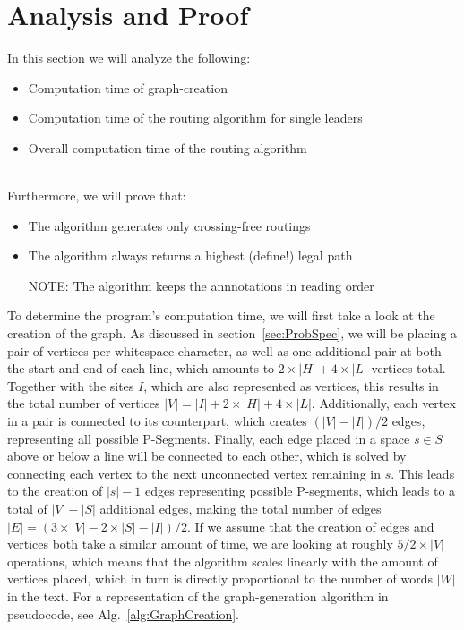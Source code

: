 \documentclass[11pt,a4paper]{vutinfth}
\begin{document}
\section{Analysis and Proof}

In this section we will analyze the following:

\begin{itemize}
 \item Computation time of graph-creation
 \item Computation time of the routing algorithm for single leaders
 \item Overall computation time of the routing algorithm
\end{itemize}
~\\
Furthermore, we will prove that:
\begin{itemize}
\item The algorithm generates only crossing-free routings
\item The algorithm always returns a highest (define!) legal path

NOTE: The algorithm keeps the annnotations in reading order
\end{itemize}

To determine the program's computation time, we will first take a look at the creation of the graph. As discussed in section~\ref{sec:ProbSpec}, we will be placing a pair of vertices per whitespace character, as well as one additional pair at both the start and end of each line, which amounts to $2\times|H|+4\times|L|$ vertices total. Together with the sites $I$, which are also represented as vertices, this results in the total number of vertices $|V|=|I|+2\times|H|+4\times|L|$. Additionally, each vertex in a pair is connected to its counterpart, which creates $(|V|-|I|)/2$ edges, representing all possible P-Segments. Finally, each edge placed in a space $s \in S$ above or below a line will be connected to each other, which is solved by connecting each vertex to the next unconnected vertex remaining in $s$. This leads to the creation of $|s|-1$ edges representing possible P-segments, which leads to a total of $|V|-|S|$ additional edges, making the total number of edges $|E|=(3\times|V|-2\times|S|-|I|)/2$.%
If we assume that the creation of edges and vertices both take a similar amount of time, we are looking at roughly $5/2 \times |V|$ operations, which means that the algorithm scales linearly with the amount of vertices placed, which in turn is directly proportional to the number of words $|W|$ in the text.
For a representation of the graph-generation algorithm in pseudocode, see Alg.~\ref{alg:GraphCreation}.
\end{document}
